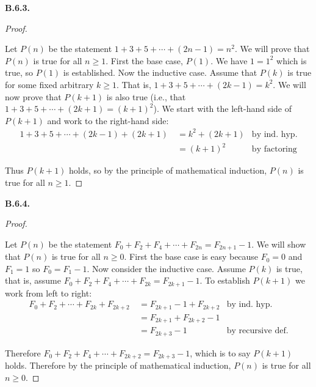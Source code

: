 \documentclass[10pt,]{book}
\theoremstyle{plain}
\theoremstyle{definition}
\theoremstyle{definition}
\theoremstyle{definition}
\theoremstyle{definition}
\numberwithin{equation}{chapter}
\newcommand{\amp}{&}
\begin{document}
\par\smallskip
\noindent\textbf{B.6.3.} \begin{proof}\hypertarget{proof-43}{}
\hypertarget{p-2263}{}%
Let \(P(n)\) be the statement \(1+3 +5 + \cdots + (2n-1) = n^2\). We will prove that \(P(n)\) is true for all \(n \ge 1\). First the base case, \(P(1)\). We have \(1 = 1^2\) which is true, so \(P(1)\) is established. Now the inductive case. Assume that \(P(k)\) is true for some fixed arbitrary \(k \ge 1\). That is, \(1 + 3 + 5 + \cdots + (2k-1) = k^2\). We will now prove that \(P(k+1)\) is also true (i.e., that \(1 + 3 + 5 + \cdots + (2k+1) = (k+1)^2\)). We start with the left-hand side of \(P(k+1)\) and work to the right-hand side:%
\begin{align*}
1 + 3 + 5 + \cdots + (2k-1) + (2k+1) ~ \amp = k^2 + (2k+1) \amp \text{by ind. hyp.}\\
\amp = (k+1)^2 \amp \text{by factoring}
\end{align*}
%
\par
\hypertarget{p-2264}{}%
Thus \(P(k+1)\) holds, so by the principle of mathematical induction, \(P(n)\) is true for all \(n \ge 1\).%
\end{proof}
\par\smallskip
\noindent\textbf{B.6.4.} \begin{proof}\hypertarget{proof-44}{}
\hypertarget{p-2266}{}%
Let \(P(n)\) be the statement \(F_0 + F_2 + F_4 + \cdots + F_{2n} = F_{2n+1} - 1\). We will show that \(P(n)\) is true for all \(n \ge 0\). First the base case is easy because \(F_0 = 0\) and \(F_1 = 1\) so \(F_0 = F_1 - 1\). Now consider the inductive case. Assume \(P(k)\) is true, that is, assume \(F_0 + F_2 + F_4 + \cdots + F_{2k} = F_{2k+1} - 1\). To establish \(P(k+1)\) we work from left to right:%
\begin{align*}
F_0 + F_2 + \cdots + F_{2k} + F_{2k+2} ~ \amp = F_{2k+1} - 1 + F_{2k+2} \amp \text{by ind. hyp.}\\
\amp = F_{2k+1} + F_{2k+2} - 1 \amp\\
\amp = F_{2k+3} - 1 \amp \text{by recursive def.}
\end{align*}
%
\par
\hypertarget{p-2267}{}%
Therefore \(F_0 + F_2 + F_4 + \cdots + F_{2k+2} = F_{2k+3} - 1\), which is to say \(P(k+1)\) holds. Therefore by the principle of mathematical induction, \(P(n)\) is true for all \(n \ge 0\).%
\end{proof}
\par\smallskip
\end{document}
